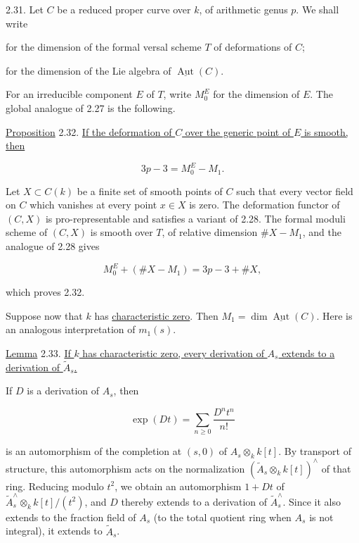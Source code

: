 
2.31. Let $C$ be a reduced proper curve over $k$, of arithmetic genus $p$.
We shall write

\begin{description}[leftmargin=2.7cm,style=nextline]
\item[$M_0$] for the dimension of the formal versal scheme $T$ of deformations
of $C$;
\item[$M_1$] for the dimension of the Lie algebra of
$\underline{\operatorname{Aut}}(C)$.
\end{description}

For an irreducible component $E$ of $T$, write $M_0^E$ for the dimension of
$E$.  The global analogue of 2.27 is the following.

\underline{Proposition} 2.32. \underline{If the deformation of $C$ over the
generic point of $E$ is smooth, then}

\begin{equation*}
3p-3=M_0^E-M_1.
\end{equation*}

Let $X\subset C(k)$ be a finite set of smooth points of $C$ such that every
vector field on $C$ which vanishes at every point $x\in X$ is zero.  The
deformation functor of $(C,X)$ is pro-representable and satisfies a variant of
2.28.  The formal moduli scheme of $(C,X)$ is smooth over $T$, of relative
dimension $\#X-M_1$, and the analogue of 2.28 gives

\begin{equation*}
M_0^E+(\#X-M_1)=3p-3+\#X,
\end{equation*}

which proves 2.32.

Suppose now that $k$ has \underline{characteristic zero}.  Then
$M_1=\dim\underline{\operatorname{Aut}}(C)$.  Here is an analogous
interpretation of $m_1(s)$.


\underline{Lemma} 2.33. \underline{If $k$ has characteristic zero, every
derivation of $A_s$ extends to a derivation of $\widetilde A_s$.}

If $D$ is a derivation of $A_s$, then

\begin{equation*}
\exp(Dt)=\sum_{n\geq0}\frac{D^nt^n}{n!}
\end{equation*}

is an automorphism of the completion at $(s,0)$ of
$A_s\otimes_k k[t]$.  By transport of structure, this automorphism acts on the
normalization $(\widetilde A_s\otimes_k k[t])^{\wedge}$ of that ring.  Reducing
modulo $t^2$, we obtain an automorphism $1+Dt$ of
$\widetilde A_s^{\wedge}\otimes_k k[t]/(t^2)$, and $D$ thereby extends to a
derivation of $\widetilde A_s^{\wedge}$.  Since it also extends to the fraction
field of $A_s$ (to the total quotient ring when $A_s$ is not integral), it
extends to $\widetilde A_s$.

